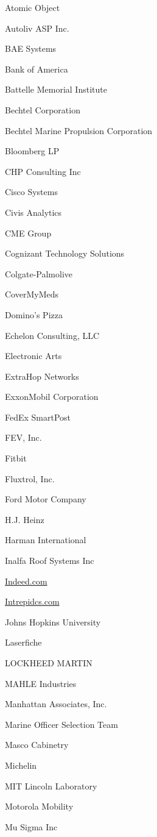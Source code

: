 \documentclass[twoside]{article}
\begin{document}
\begin{center}
\begin{multicols}{5}
\begin{FlushLeft}
\begin{compactitem}
\item Atomic Object
\item Autoliv ASP Inc.
\item BAE Systems
\item Bank of America
\item Battelle Memorial Institute
\item Bechtel Corporation
\item Bechtel Marine Propulsion Corporation
\item Bloomberg LP
\item CHP Consulting Inc
\item Cisco Systems
\item Civis Analytics
\item CME Group
\item Cognizant Technology Solutions
\item Colgate-Palmolive
\item CoverMyMeds
\item Domino's Pizza
\item Echelon Consulting, LLC
\item Electronic Arts
\item ExtraHop Networks
\item ExxonMobil Corporation
\item FedEx SmartPost
\item FEV, Inc.
\item Fitbit
\item Fluxtrol, Inc.
\item Ford Motor Company
\item H.J. Heinz
\item Harman International
\item Inalfa Roof Systems Inc
\item \url{Indeed.com}
\item \url{Intrepidcs.com}
\item Johns Hopkins University
\item Laserfiche
\item LOCKHEED MARTIN
\item MAHLE Industries
\item Manhattan Associates, Inc.
\item Marine Officer Selection Team
\item Masco Cabinetry
\item Michelin
\item MIT Lincoln Laboratory
\item Motorola Mobility
\item Mu Sigma Inc

\end{compactitem}
\end{FlushLeft}
\end{multicols}
\end{center}
\end{document}
